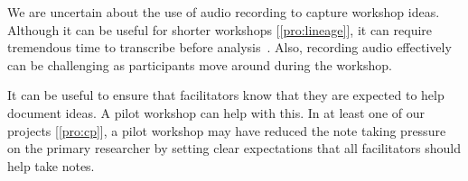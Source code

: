 We are uncertain about the use of audio recording to capture workshop ideas. Although it can be useful for shorter workshops [\ref{pro:lineage}], it can require tremendous time to transcribe before analysis~\cite{Lloyd2011}. Also, recording audio effectively can be challenging as participants move around during the workshop.

It can be useful to ensure that facilitators know that they are expected to help document ideas. A pilot workshop can help with this. In at least one of our projects [\ref{pro:cp}], a pilot workshop may have reduced the note taking pressure on the primary researcher by setting clear expectations that all facilitators should help take notes.



